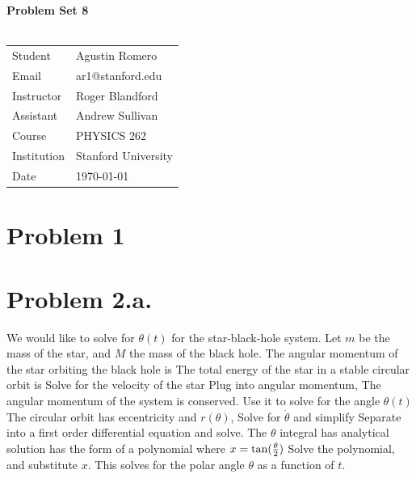 \documentclass{article}
\begin{document}
\begin{center}
\textbf{\Large{Problem Set 8}}\\~\\
\begin{tabular}{l l}
Student&Agustin Romero\\
Email&ar1@stanford.edu\\
Instructor&Roger Blandford\\
Assistant&Andrew Sullivan\\
Course&PHYSICS 262\\
Institution&Stanford University\\
Date&\today\\
\end{tabular}
\end{center}
\section*{Problem 1}

\section*{Problem 2.a.}
We would like to solve for $\theta(t)$ for the star-black-hole system. Let $m$ be the mass of the star, and $M$ the mass of the black hole. The angular momentum of the star orbiting the black hole is
The total energy of the star in a stable circular orbit is
Solve for the velocity of the star
Plug into angular momentum,
The angular momentum of the system is conserved. Use it to solve for the angle $\theta(t)$
The circular orbit has eccentricity
and $r(\theta)$,
Solve for $\dot{\theta}$ and simplify
Separate into a first order differential equation and solve.
The $\theta$ integral has analytical solution
 has the form of a polynomial where $x=\tan(\frac{\theta}{2})$
Solve the polynomial, and substitute $x$. This solves for the polar angle $\theta$ as a function of $t$.
\end{document}
